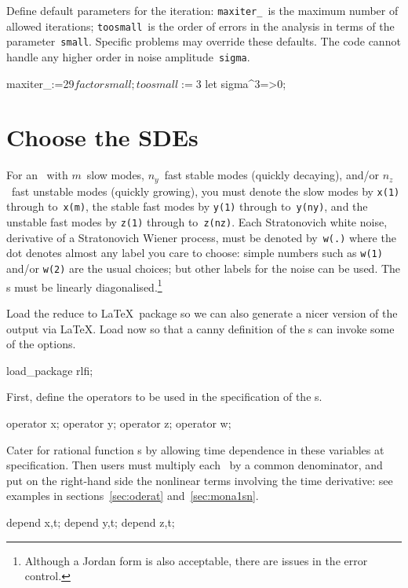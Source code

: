 \documentclass[11pt,a5paper]{article}
\begin{document}
Define default parameters for the iteration:
\verb|maxiter_|~is the maximum number of allowed iterations;
\verb|toosmall|~is the order of errors in the analysis in terms of the parameter~\verb|small|.
Specific problems may override these defaults.
The code cannot handle any higher order in noise amplitude~\verb|sigma|.
\begin{reduce}
maxiter_:=29$
factor small; 
toosmall:=3$
let sigma^3=>0;
\end{reduce}




\section{Choose the SDEs}

For an \sde\ with $m$~slow modes, $n_y$~fast stable modes (quickly decaying), and/or \(n_z\)~fast unstable modes (quickly growing), you must denote the slow modes by \verb|x(1)| through to~\verb|x(m)|, the stable fast modes by \verb|y(1)| through to~\verb|y(ny)|, and the unstable fast modes by \verb|z(1)| through to~\verb|z(nz)|.
Each Stratonovich white noise, derivative of a Stratonovich Wiener process, must be denoted by~\verb|w(.)| where the dot denotes almost any label you care to choose: simple numbers such as \verb|w(1)| and/or \verb|w(2)| are the usual choices; but other labels for the noise can be used.
The \sde{}s must be linearly diagonalised.\footnote{Although a Jordan form is also acceptable, there are issues in the error control.}  

Load the reduce to \LaTeX\ package so we can also generate a nicer version of the output via \LaTeX.
Load now so that a canny definition of the \sde{}s can invoke some of the options.  
\begin{reduce}
load_package rlfi;
\end{reduce}

First, define the operators to be used in the specification of the \sde{}s.  
\begin{reduce}
operator x;
operator y;
operator z;
operator w;
\end{reduce}

Cater for rational function \sde{}s by allowing time dependence in these variables at specification.  
Then users must multiply each \sde\ by a common denominator, and put on the right-hand side the nonlinear terms involving the time derivative: see examples in sections~\ref{sec:oderat} and~\ref{sec:mona1sn}.
\begin{reduce}
depend x,t;
depend y,t;
depend z,t;
\end{reduce}
\end{document}
